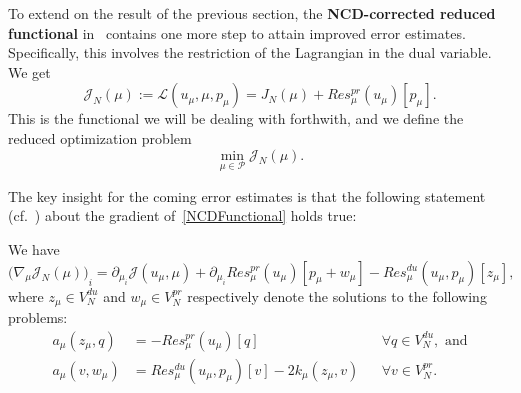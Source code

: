 To extend on the result of the previous section, the \textbf{NCD-corrected reduced functional} in~\cite[Subsection 3.3]{Keil2021} contains one more step to attain improved error estimates.
Specifically, this involves the restriction of the Lagrangian in the dual variable.
We get
\begin{equation}\label{NCDFunctional}
    \mathcal{J}_N(\mu) := \mathcal{L}(u_\mu, \mu, p_\mu) = J_N(\mu) + Res_\mu^{pr}(u_\mu)[p_\mu].
\end{equation}
This is the functional we will be dealing with forthwith, and we define the reduced optimization problem
\begin{equation}\label{ReducProb}
    \min\limits_{\mu \in \mathcal{P}} \mathcal{J}_N(\mu).
\end{equation}

The key insight for the coming error estimates is that the following statement (cf.~\cite[Proposition 3.3]{Keil2021}) about the gradient of~\eqref{NCDFunctional} holds true:
\begin{proposition}\label{NCDGradientProp}
    We have
    \begin{equation*}\label{NCDGradient}
        {\big( \nabla_\mu \mathcal{J}_N(\mu) \big)}_i = \partial_{\mu_i} \mathcal{J}(u_\mu, \mu) + \partial_{\mu_i} Res_\mu^{pr}(u_\mu)[p_\mu + w_\mu] - Res_\mu^{du}(u_\mu, p_\mu)[z_\mu],
    \end{equation*}
    where $z_\mu \in V_N^{du}$ and $w_\mu \in V_N^{pr}$ respectively denote the solutions to the following problems:
    \begin{align*}
        a_\mu(z_\mu, q) &= -Res_\mu^{pr}(u_\mu)[q] &&\forall q \in V_N^{du}, \text{ and} \\
        a_\mu(v, w_\mu) &= Res_\mu^{du}(u_\mu, p_\mu)[v] - 2 k_\mu(z_\mu, v) &&\forall v \in V_N^{pr}.
    \end{align*}
\end{proposition}

